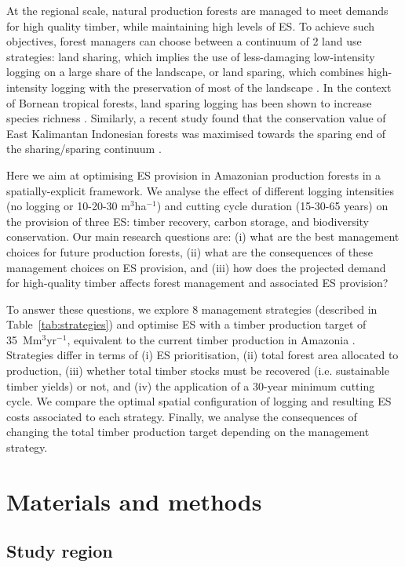 \documentclass{article}
\begin{document}
At the regional scale, natural production forests are managed to meet demands for high quality timber, while maintaining high levels of ES. To achieve such objectives, forest managers can choose between a continuum of 2 land use strategies: land sharing, which implies the use of less-damaging low-intensity logging on a large share of the landscape, or land sparing, which combines high-intensity logging with the preservation of most of the landscape \cite{Green2005}. In the context of Bornean tropical forests, land sparing logging has been shown to increase species richness \cite{Edwards2014}. Similarly, a recent study found that the conservation value of East Kalimantan Indonesian forests was maximised towards the sparing end of the sharing/sparing continuum \cite{Runting2018}.

Here we aim at optimising ES provision in Amazonian production forests in a spatially-explicit framework. We analyse the effect of different logging intensities (no logging or 10-20-30 m$^3$ha$^{-1}$) and cutting cycle duration (15-30-65 years) on the provision of three ES: timber recovery, carbon storage, and biodiversity conservation. Our main research questions are: (i) what are the best management choices for future production forests, (ii) what are the consequences of these management choices on ES provision, and (iii) how does the projected demand for high-quality timber affects forest management and associated ES provision? 

To answer these questions, we explore 8 management strategies (described in Table~\ref{tab:strategies}) and optimise ES with a timber production target of 35~Mm$^3$yr$^{-1}$, equivalent to the current timber production in Amazonia \cite{Lentini2005}. Strategies differ in terms of (i) ES prioritisation, (ii) total forest area allocated to production, (iii) whether total timber stocks must be recovered (i.e. sustainable timber yields) or not, and (iv) the application of a 30-year minimum cutting cycle. We compare the optimal spatial configuration of logging and resulting ES costs associated to each strategy. 
Finally, we analyse the consequences of changing the total timber production target depending on the management strategy.

\section{Materials and methods}

\subsection{Study region}
\end{document}
